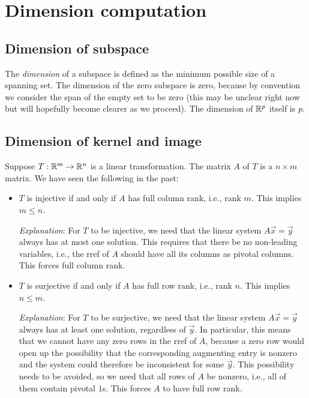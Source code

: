 \documentclass[10pt]{amsart}
\begin{document}
\section{Dimension computation}

\subsection{Dimension of subspace}

The {\em dimension} of a subspace is defined as the minimum possible
size of a spanning set. The dimension of the zero subspace is zero,
because by convention we consider the span of the empty set to be zero
(this may be unclear right now but will hopefully become clearer as we
proceed). The dimension of $\mathbb{R}^p$ itself is $p$.

\subsection{Dimension of kernel and image}

Suppose $T: \mathbb{R}^m \to \mathbb{R}^n$ is a linear transformation. The matrix $A$
of $T$ is a $n \times m$ matrix. We have seen the following in the past:

\begin{itemize}
\item $T$ is injective if and only if $A$ has full column rank, i.e.,
  rank $m$. This implies $m \le n$.

  {\em Explanation}: For $T$ to be injective, we need that the linear
  system $A\vec{x} = \vec{y}$ always has at most one solution. This
  requires that there be no non-leading variables, i.e., the rref of
  $A$ should have all its columns as pivotal columns. This forces full
  column rank.
\item $T$ is surjective if and only if $A$ has full row rank, i.e.,
  rank $n$. This implies $n \le m$.

  {\em Explanation}: For $T$ to be surjective, we need that the linear
  system $A \vec{x} = \vec{y}$ always has at least one solution,
  regardless of $\vec{y}$. In particular, this means that we cannot
  have any zero rows in the rref of $A$, because a zero row would open
  up the possibility that the corresponding augmenting entry is
  nonzero and the system could therefore be inconsistent for some
  $\vec{y}$. This possibility needs to be avoided, so we need that all
  rows of $A$ be nonzero, i.e., all of them contain pivotal $1$s. This
  forces $A$ to have full row rank.
\end{itemize}
\end{document}
